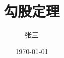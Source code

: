 




\documentclass[UTF8]{ctexart}	%
\usepackage{graphicx}	%
\usepackage{subfigure}
\graphicspath{{figs/}}

\usepackage{geometry}	%
\geometry{a4paper,centering,scale = 0.8}

\usepackage[format=hang,font=small,textfont=it]{caption} %

\newenvironment{myquote}	%
	{\begin{quote}\heiti\zihao{-5}}{\end{quote}}
	
\newcommand \degree{^\circ}	%

\usepackage[nottoc]{tocbibind}	%

\title{\heiti 勾股定理}	%
\author{\heiti 张三}
\date{\heiti \today}



\maketitle	%

